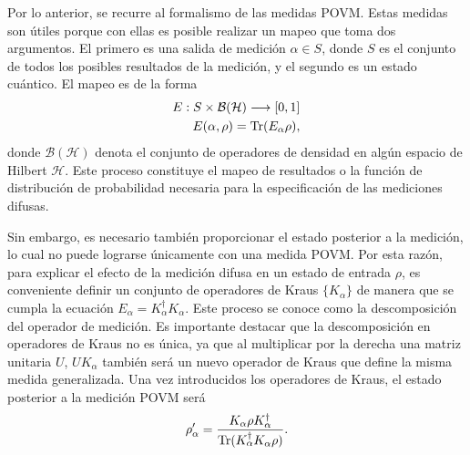 Por lo anterior, se recurre al formalismo de las medidas POVM\@. Estas medidas
son útiles porque con ellas es posible realizar un mapeo que toma dos
argumentos. El primero es una salida de medición $\alpha \in S $, donde $S$ es
el conjunto de todos los posibles resultados de la medición, y el segundo es un
estado cuántico. El mapeo es de la forma 
\begin{equation}\begin{split}
    E:S\times \mathcal{B(H)}\longrightarrow [0,1]\\
    E(\alpha,\rho)={\rm Tr}(E_\alpha\rho),
\end{split}\end{equation} donde $\mathcal{B(H)}$ denota el conjunto de operadores de densidad en algún espacio de Hilbert $\mathcal{H}$. 
Este proceso constituye el mapeo de resultados o la función de
distribución de probabilidad necesaria para la especificación de las mediciones
difusas.  


Sin embargo, es necesario también proporcionar el estado posterior a la
medición, lo cual no puede lograrse únicamente con una medida POVM\@. Por esta
razón, para explicar el efecto de la medición difusa en un estado de entrada
$\rho$, es conveniente definir un conjunto de operadores de Kraus
$\{K_\alpha\}$ de manera que se cumpla la ecuación $E_\alpha=K_\alpha^\dagger
K_\alpha$. Este proceso se conoce como la descomposición del operador de
medición. Es importante destacar que la descomposición en operadores de Kraus
no es única, ya que al multiplicar por la derecha una matriz unitaria $U$,
$UK_{\alpha}$ también será un nuevo operador de Kraus que define la misma
medida generalizada. Una vez introducidos los operadores de Kraus, el estado
posterior a la medición POVM será 
\begin{equation}
\rho'_\alpha=\dfrac{K_\alpha \rho K_\alpha^\dagger}{{\rm Tr}(K_\alpha^\dagger K_\alpha \rho)}.
\end{equation}




